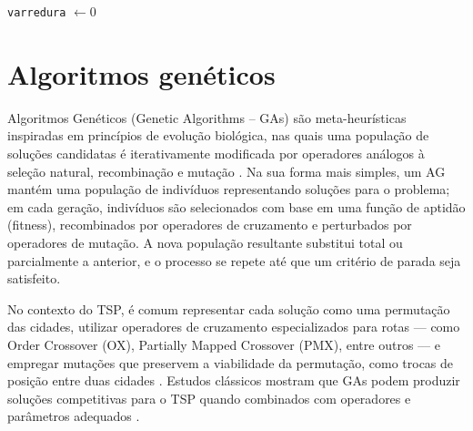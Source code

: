 \begin{algorithm}[H]
  \caption{Busca local \(2\)-opt limitada}
  \label{alg:2opt-limited}
  \texttt{varredura} \(\gets 0\)\;
  \;
\end{algorithm}

\section{Algoritmos genéticos}\label{sec-23-algoritmos-geneticos}

Algoritmos Genéticos (Genetic Algorithms -- GAs) são meta-heurísticas
inspiradas em princípios de evolução biológica, nas quais uma população
de soluções candidatas é iterativamente modificada por operadores
análogos à seleção natural, recombinação e mutação
\autocite{goldberg1989genetic,eiben2015introduction}. Na sua forma mais
simples, um AG mantém uma população de indivíduos representando soluções
para o problema; em cada geração, indivíduos são selecionados com base
em uma função de aptidão (fitness), recombinados por operadores de
cruzamento e perturbados por operadores de mutação. A nova população
resultante substitui total ou parcialmente a anterior, e o processo se
repete até que um critério de parada seja satisfeito.

No contexto do TSP, é comum representar cada solução como uma permutação
das cidades, utilizar operadores de cruzamento especializados para rotas
--- como Order Crossover (OX), Partially Mapped Crossover (PMX), entre
outros --- e empregar mutações que preservem a viabilidade da
permutação, como trocas de posição entre duas cidades
\autocite{larranaga1999genetic}. Estudos clássicos mostram que GAs podem
produzir soluções competitivas para o TSP quando combinados com
operadores e parâmetros adequados \autocite{goldberg1989genetic}.

